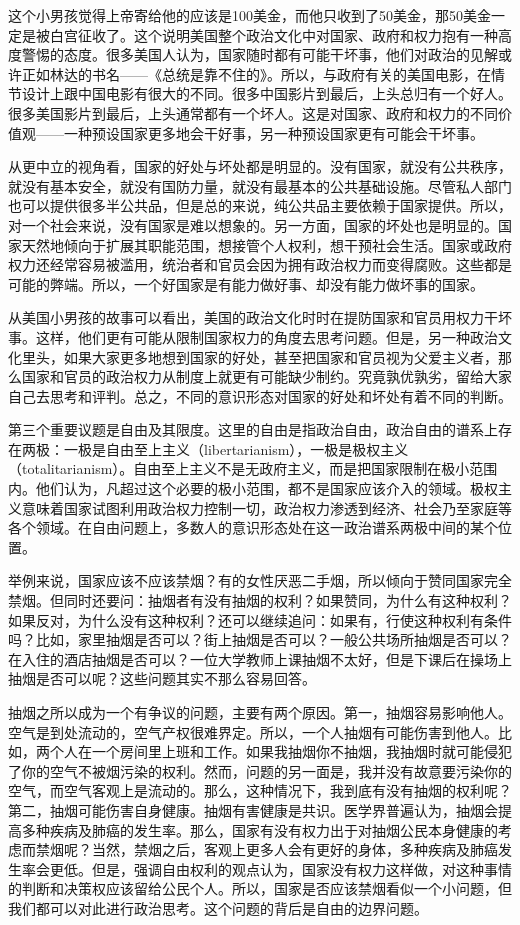 这个小男孩觉得上帝寄给他的应该是100美金，而他只收到了50美金，那50美金一定是被白宫征收了。这个说明美国整个政治文化中对国家、政府和权力抱有一种高度警惕的态度。很多美国人认为，国家随时都有可能干坏事，他们对政治的见解或许正如林达的书名——《总统是靠不住的》。所以，与政府有关的美国电影，在情节设计上跟中国电影有很大的不同。很多中国影片到最后，上头总归有一个好人。很多美国影片到最后，上头通常都有一个坏人。这是对国家、政府和权力的不同价值观——一种预设国家更多地会干好事，另一种预设国家更有可能会干坏事。

从更中立的视角看，国家的好处与坏处都是明显的。没有国家，就没有公共秩序，就没有基本安全，就没有国防力量，就没有最基本的公共基础设施。尽管私人部门也可以提供很多半公共品，但是总的来说，纯公共品主要依赖于国家提供。所以，对一个社会来说，没有国家是难以想象的。另一方面，国家的坏处也是明显的。国家天然地倾向于扩展其职能范围，想接管个人权利，想干预社会生活。国家或政府权力还经常容易被滥用，统治者和官员会因为拥有政治权力而变得腐败。这些都是可能的弊端。所以，一个好国家是有能力做好事、却没有能力做坏事的国家。

从美国小男孩的故事可以看出，美国的政治文化时时在提防国家和官员用权力干坏事。这样，他们更有可能从限制国家权力的角度去思考问题。但是，另一种政治文化里头，如果大家更多地想到国家的好处，甚至把国家和官员视为父爱主义者，那么国家和官员的政治权力从制度上就更有可能缺少制约。究竟孰优孰劣，留给大家自己去思考和评判。总之，不同的意识形态对国家的好处和坏处有着不同的判断。

第三个重要议题是自由及其限度。这里的自由是指政治自由，政治自由的谱系上存在两极：一极是自由至上主义（libertarianism），一极是极权主义（totalitarianism）。自由至上主义不是无政府主义，而是把国家限制在极小范围内。他们认为，凡超过这个必要的极小范围，都不是国家应该介入的领域。极权主义意味着国家试图利用政治权力控制一切，政治权力渗透到经济、社会乃至家庭等各个领域。在自由问题上，多数人的意识形态处在这一政治谱系两极中间的某个位置。

举例来说，国家应该不应该禁烟？有的女性厌恶二手烟，所以倾向于赞同国家完全禁烟。但同时还要问：抽烟者有没有抽烟的权利？如果赞同，为什么有这种权利？如果反对，为什么没有这种权利？还可以继续追问：如果有，行使这种权利有条件吗？比如，家里抽烟是否可以？街上抽烟是否可以？一般公共场所抽烟是否可以？在入住的酒店抽烟是否可以？一位大学教师上课抽烟不太好，但是下课后在操场上抽烟是否可以呢？这些问题其实不那么容易回答。

抽烟之所以成为一个有争议的问题，主要有两个原因。第一，抽烟容易影响他人。空气是到处流动的，空气产权很难界定。所以，一个人抽烟有可能伤害到他人。比如，两个人在一个房间里上班和工作。如果我抽烟你不抽烟，我抽烟时就可能侵犯了你的空气不被烟污染的权利。然而，问题的另一面是，我并没有故意要污染你的空气，而空气客观上是流动的。那么，这种情况下，我到底有没有抽烟的权利呢？第二，抽烟可能伤害自身健康。抽烟有害健康是共识。医学界普遍认为，抽烟会提高多种疾病及肺癌的发生率。那么，国家有没有权力出于对抽烟公民本身健康的考虑而禁烟呢？当然，禁烟之后，客观上更多人会有更好的身体，多种疾病及肺癌发生率会更低。但是，强调自由权利的观点认为，国家没有权力这样做，对这种事情的判断和决策权应该留给公民个人。所以，国家是否应该禁烟看似一个小问题，但我们都可以对此进行政治思考。这个问题的背后是自由的边界问题。


